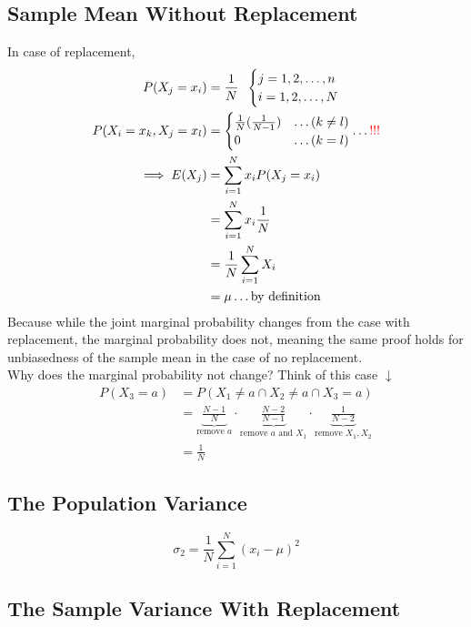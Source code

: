 \documentclass[
]{article}
\begin{document}
\hypertarget{sample-mean-without-replacement}{%
\subsection{Sample Mean Without
Replacement}\label{sample-mean-without-replacement}}

In case of replacement, \[\begin{aligned} 
P(X_j = x_i) &= \frac{1}{N}\;\; \begin{cases} j = 1, 2, \dots, n \\ i = 1, 2, \dots, N \end{cases} \\
P(X_i = x_k, X_j = x_l) &= \begin{cases} 
\frac{1}N(\frac{1}{N-1}) &\dots (k\ne l) \\
0 &\dots (k =l)
\end{cases} \dots \color{red}{!!!}\\
\implies E(X_j) &= \sum_{i=1}^{N}x_iP(X_j=x_i) \\
&= \sum_{i=1}^{N}x_i\frac{1}{N} \\
&= \frac{1}{N} \sum^N_{i=1} X_i \\
&= \mu \dots \text{by definition}
\end{aligned}\] Because while the joint marginal probability changes
from the case with replacement, the marginal probability does not,
meaning the same proof holds for unbiasedness of the sample mean in the
case of no replacement.\\
Why does the marginal probability not change? Think of this case
\(\downarrow\) \[\begin{aligned} 
P(X_3 = a) &= P(X_1 \ne a \cap X_2 \ne a \cap X_3 = a) \\
&= \underbrace{\frac{N-1}{N}}_\text{remove \(a\)} \cdot  \underbrace{\frac{N-2}{N-1}}_\text{remove \(a\) and \(X_1\)} \cdot \underbrace{\frac{1}{N-2}}_\text{remove \(X_1, X_2\)} \\
&= \frac{1}{N}
\end{aligned}\]

\hypertarget{the-population-variance}{%
\subsection{The Population Variance}\label{the-population-variance}}

\[\sigma_2 = \frac{1}{N} \sum_{i=1}^{N} (x_i - \mu)^2\]

\hypertarget{the-sample-variance-with-replacement}{%
\subsection{The Sample Variance With
Replacement}\label{the-sample-variance-with-replacement}}
\end{document}
